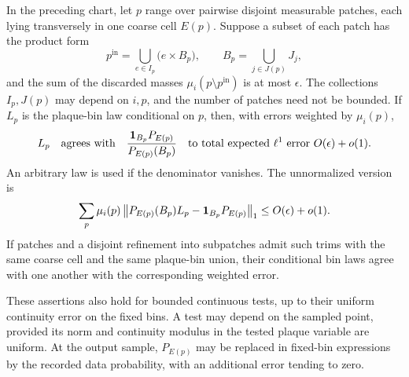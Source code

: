 \begin{lemma}\label{lem:patch-comparison}
In the preceding chart, let $p$ range over pairwise disjoint
measurable patches, each lying transversely in one coarse cell
$E(p)$. Suppose a subset of each patch has the product form
\[
 p^{\mathrm{in}}=
 \bigcup_{e\in I_p}\bigl(e\times B_p\bigr),
 \qquad B_p=\bigcup_{j\in J(p)}J_j,
\]
and the sum of the discarded masses $\mu_i(p\setminus p^{\mathrm{in}})$
is at most $\epsilon$. The collections $I_p,J(p)$ may depend on
$i,p$, and the number of patches need not be bounded. If $L_p$ is
the plaque-bin law conditional on $p$, then, with errors weighted by
$\mu_i(p)$,
\[
 L_p\quad\hbox{agrees with}\quad
 \frac{\mathbf 1_{B_p}P_{E(p)}}{P_{E(p)}(B_p)}
 \quad\text{to total expected }\ell^1\text{ error }
 O(\epsilon)+o(1).
\]
An arbitrary law is used if the denominator vanishes. The
unnormalized version is
\begin{equation}\label{eq:patch-unnormalized}
 \sum_p\mu_i(p)
 \left\|P_{E(p)}(B_p)L_p-
             \mathbf 1_{B_p}P_{E(p)}\right\|_1
 \le O(\epsilon)+o(1).
\end{equation}
If patches and a disjoint refinement into subpatches admit such trims with the same
coarse cell and the same plaque-bin union, their conditional bin
laws agree with one another with the corresponding weighted error.

These assertions also hold for bounded continuous tests, up to their
uniform continuity error on the fixed bins. A test may depend on
the sampled point, provided its norm and continuity modulus in the
tested plaque variable are uniform. At the output sample,
$P_{E(p)}$ may be replaced in fixed-bin expressions by the recorded
data probability, with an additional error tending to zero.
\end{lemma}

